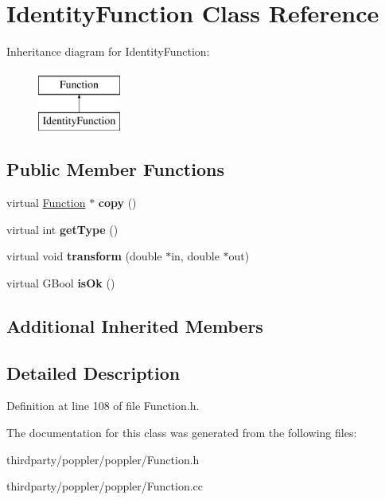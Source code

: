 \hypertarget{class_identity_function}{}\section{Identity\+Function Class Reference}
\label{class_identity_function}
Inheritance diagram for Identity\+Function\+:\begin{figure}[H]
\begin{center}
\leavevmode
\includegraphics[height=2.000000cm]{class_identity_function}
\end{center}
\end{figure}
\subsection*{Public Member Functions}
\begin{DoxyCompactItemize}
\item 
\mbox{\label{class_identity_function_a0bf497cd781ae8bd56f2ce16016fdb9c}} 
virtual \hyperlink{class_function}{Function} $\ast$ {\bfseries copy} ()
\item 
\mbox{\label{class_identity_function_ad13fe3a092062a22d4036eb76811505d}} 
virtual int {\bfseries get\+Type} ()
\item 
\mbox{\label{class_identity_function_a2db3e55a87c14ed77f8fb37e21146f15}} 
virtual void {\bfseries transform} (double $\ast$in, double $\ast$out)
\item 
\mbox{\label{class_identity_function_adbf18e213edd48612a3b2cf500c286d2}} 
virtual G\+Bool {\bfseries is\+Ok} ()
\end{DoxyCompactItemize}
\subsection*{Additional Inherited Members}


\subsection{Detailed Description}


Definition at line 108 of file Function.\+h.



The documentation for this class was generated from the following files\+:\begin{DoxyCompactItemize}
\item 
thirdparty/poppler/poppler/Function.\+h\item 
thirdparty/poppler/poppler/Function.\+cc\end{DoxyCompactItemize}

